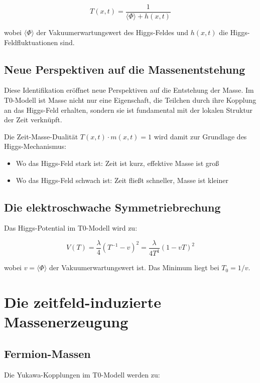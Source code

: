\documentclass[12pt,a4paper]{report}
\begin{document}
\begin{equation}
	T(x,t) = \frac{1}{\langle\Phi\rangle + h(x,t)}
\end{equation}

wobei $\langle\Phi\rangle$ der Vakuumerwartungswert des Higgs-Feldes und $h(x,t)$ die Higgs-Feldfluktuationen sind.

\subsection{Neue Perspektiven auf die Massenentstehung}

Diese Identifikation eröffnet neue Perspektiven auf die Entstehung der Masse. Im T0-Modell ist Masse nicht nur eine Eigenschaft, die Teilchen durch ihre Kopplung an das Higgs-Feld erhalten, sondern sie ist fundamental mit der lokalen Struktur der Zeit verknüpft.

Die Zeit-Masse-Dualität $T(x,t) \cdot m(x,t) = 1$ wird damit zur Grundlage des Higgs-Mechanismus:
\begin{itemize}
	\item Wo das Higgs-Feld stark ist: Zeit ist kurz, effektive Masse ist groß
	\item Wo das Higgs-Feld schwach ist: Zeit fließt schneller, Masse ist kleiner
\end{itemize}

\subsection{Die elektroschwache Symmetriebrechung}

Das Higgs-Potential im T0-Modell wird zu:

\begin{equation}
	V(T) = \frac{\lambda}{4}(T^{-1} - v)^2 = \frac{\lambda}{4T^4}(1 - vT)^2
\end{equation}

wobei $v = \langle\Phi\rangle$ der Vakuumerwartungswert ist. Das Minimum liegt bei $T_0 = 1/v$.

\section{Die zeitfeld-induzierte Massenerzeugung}

\subsection{Fermion-Massen}

Die Yukawa-Kopplungen im T0-Modell werden zu:
\end{document}

